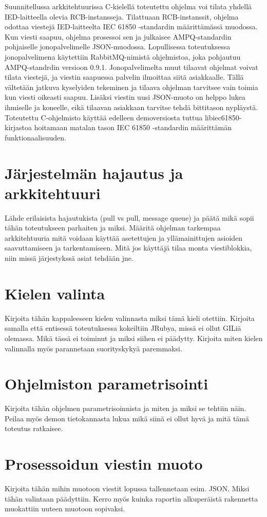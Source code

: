 Suunnitellussa arkkitehtuurissa C-kielellä toteutettu ohjelma voi tilata yhdellä IED-laitteella olevia RCB-instansseja. Tilattuaan RCB-instanssit, ohjelma odottaa viestejä IED-laitteelta IEC 61850 -standardin määrittämässä muodossa. Kun viesti saapuu, ohjelma prosessoi sen ja julkaisee AMPQ-standardin pohjaiselle jonopalvelimelle JSON-muodossa. Lopullisessa toteutuksessa jonopalvelimena käytettiin RabbitMQ-nimistä ohjelmistoa, joka pohjautuu AMPQ-standrdin versioon 0.9.1. Jonopalvelimelta muut tilaavat ohjelmat voivat tilata viestejä, ja viestin saapuessa palvelin ilmoittaa siitä asiakkaalle. Tällä vältetään jatkuva kyselyiden tekeminen ja tilaava ohjelman tarvitsee vain toimia kun viesti oikeasti saapuu. Lisäksi viestin uusi JSON-muoto on helppo lukea ihmiselle ja koneelle, eikä tilaavan asiakkaan tarvitse tehdä bittitason nypläystä. Toteutettu C-ohjelmisto käyttää edelleen demoversiosta tuttua libiec61850-kirjastoa hoitamaan matalan tason IEC 61850 -standardin määrittämän funktionaalisuuden.


\section{Järjestelmän hajautus ja arkkitehtuuri}
\begin{it}
	Lähde erilaisista hajautukista (pull vs pull, message queue) ja päätä mikä sopii tähän toteutukseen parhaiten ja miksi.
	Määritä ohjelman tarkempaa arkkitehtuuria mitä voidaan käyttää asetettujen ja yllämainittujen asioiden saavuttamiseen ja tarkentamiseen. Mitä jos käyttäjä tilaa monta viestiblokkia, niin missä järjestykssä asiat tehdään jne.
\end{it}


\section{Kielen valinta}
\begin{it}
	Kirjoita tähän kappaleeseen kielen valinnasta miksi tämä kieli otettiin. Kirjoita samalla että entisessä toteutuksessa kokeiltiin JRubya, missä ei ollut GILiä olemassa. Mikä tässä ei toiminut ja miksi siihen ei päädytty.
	Kirjoita miten kielen valinnalla myös parannetaan suorityskykyä paremmaksi.
\end{it}


\section{Ohjelmiston parametrisointi}
\begin{it}
	Kirjoita tähän ohjelmen parametrisoinnista ja miten ja miksi se tehtiin näin. Peilaa myös demon tietokannasta lukua mikä siinä ei ollut hyvä ja mitä tämä toteutus ratkaisee.
\end{it}


\section{Prosessoidun viestin muoto}
\begin{it}
	Kirjoita tähän mihin muotoon viestit lopussa tallennetaan esim. JSON. Miksi tähän valintaan päädyttiin. Kerro myös kuinka raportin alkuperäistä rakennetta muokattiin uuteen muotoon sopivaksi.
\end{it}